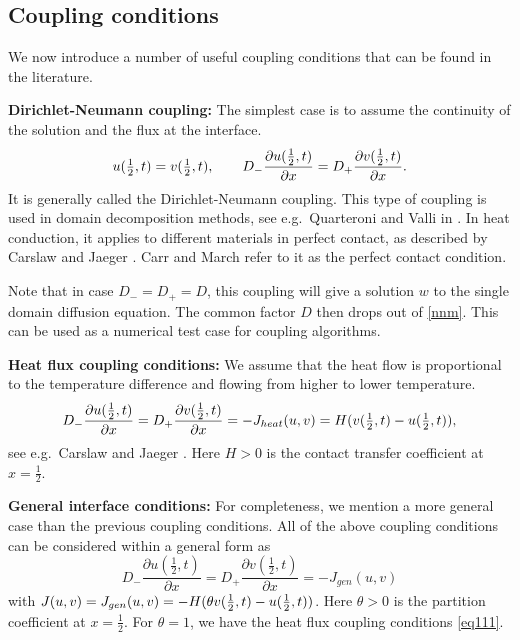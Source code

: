 %
%
\subsection{Coupling conditions}
\label{subsec:couple}
%
%

We now introduce a number of useful coupling conditions that can be found in the literature.

\noindent
{\bf Dirichlet-Neumann coupling:}
The simplest case is to assume the continuity of the solution and the flux at the interface.
%
\begin{equation}
\label{nnm}
u({\textstyle\frac 12},t)=v({\textstyle\frac 12},t),\qquad D_- 
\frac{\partial u(\frac 12,t)}{\partial x} =D_+ \frac{\partial v(\frac 12,t)}{\partial x}.
\end{equation}
%
It is generally called the Dirichlet-Neumann coupling.
This type of coupling is used in domain decomposition methods, see e.g.\ Quarteroni and Valli in \cite{bQUVA}. 
In heat conduction, it applies to different materials in perfect contact, as described by Carslaw and Jaeger \cite[p.\ 23]{b8}. Carr and March \cite{l116} refer to it as the perfect contact condition.

Note that in case $D_-=D_+=D$, this coupling will give a solution $w$ to
the single domain diffusion equation. The
common factor $D$ then drops out of \eqref{nnm}. This can be used as a numerical test case for
coupling algorithms.

\noindent
{\bf Heat flux coupling conditions:}
We assume that the heat flow is proportional to the temperature difference and flowing from higher to lower temperature.
%
\begin{equation}
D_- \frac{\partial u(\frac 12,t)}{\partial x}=D_+ \frac{\partial v(\frac 12,t)}{\partial x} 
=-J_{heat}(u,v) =H(v({\textstyle\frac 12},t)-u({\textstyle\frac 12},t)),
\label{eq111}
\end{equation}
%
see e.g.\ Carslaw and Jaeger \cite[p.~23]{b8}. Here $H>0$ is the contact transfer coefficient at $x=\frac 12$. 

\noindent
{\bf General interface conditions:}
For completeness, we mention a more general case than the previous coupling conditions.  
All of the above coupling conditions can be considered within a general form as 
%
\begin{equation}
\label{flux_gen}
D_- \frac{\partial u(\frac 12,t)}{\partial x} =D_+ \frac{\partial v(\frac 12,t)}{\partial x} =-J_{gen}(u,v)
\end{equation}
%
with $J(u,v)=J_{gen}(u,v) =-H(\theta v({\textstyle\frac 12},t)-u({\textstyle\frac 12},t))$. Here $\theta>0$ is the
partition coefficient at $x=\frac 12$. For $\theta =1$, we have the heat flux coupling conditions \eqref{eq111}.

